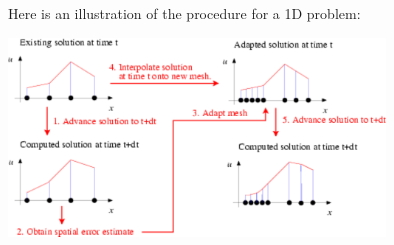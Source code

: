 Here is an illustration of the procedure for a 1D problem\+:

 
\begin{DoxyImage}
\includegraphics[width=0.75\textwidth]{adapted}
\end{DoxyImage}


